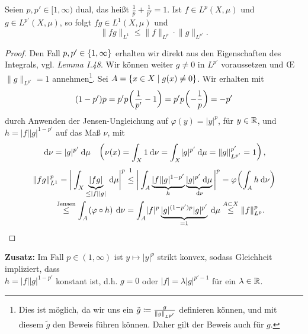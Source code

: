 \documentclass[skript.tex]{subfiles}
\begin{document}
	
\setcounter{cntr}{5}

\begin{theorem}[Hölder]
	Seien $p, p' \in [1, \infty)$ \textup{dual}, das heißt $\frac{1}{p} + \frac{1}{p'} = 1$. Ist $f \in L^p (X, \mu)$ und \\ $g \in L^{p'} (X,\mu)$, so folgt $fg \in L^1(X,\mu)$ und 
	\[
		\lVert fg \rVert_{L^1} \leq \lVert f \rVert_{L^p} \cdot \lVert g \rVert_{L^{p'}}.
	\]
\end{theorem}

\begin{proof}
	Den Fall $p,p' \in \left\{1,\infty\right\}$ erhalten wir direkt aus den Eigenschaften des Integrals, vgl. \textit{Lemma I.48}. Wir können weiter $g\neq 0$ in $L^{p'}$ voraussetzen und \OE\ $\lVert g \rVert_{L^{p'}} = 1$ annehmen\footnote{Dies ist möglich, da wir uns ein $\tilde{g} \coloneqq \frac{g}{\lVert g \rVert_{L^{p'} } }$ definieren können, und mit diesem $\tilde{g}$ den Beweis führen können. Daher gilt der Beweis auch für $g$.}. Sei $A = \left\{x\in X \mid g(x) \neq 0\right\}$. Wir erhalten mit 
	\[
		(1-p')p = p'p\pr{\frac{1}{p'} -1} = p'p\pr{-\frac{1}{p}} = -p'
	\]
	durch Anwenden der Jensen-Ungleichung auf $\varphi(y) = \lvert y \rvert^p$, für $y \in \mathbb{R}$, und $h=\lvert f \rvert \lvert g \rvert^{1-p'}$ auf das Maß $\nu$, mit 
	\[
		\md \nu = \lvert g \rvert^{p'} \md \mu \quad \pr{\nu(x) = \int_X 1 \md \nu = \int_X \lvert g \rvert^{p'} \md \mu = \lVert g \rVert_{L^{p'}}^{p'} = 1},
	\]
	\begin{align*}
		\lVert fg \rVert_{L^1}^{p} &= \bigg\lvert \int_X \underbrace{\lvert fg \rvert }_{\leq \lvert f \rvert \lvert g \rvert} \md \mu \bigg\rvert^p \stackrel{\footnotemark}{\leq} \bigg\lvert \int_A \underbrace{\lvert f \rvert \lvert g \rvert^{1-p'}}_{h} \underbrace{\lvert g \rvert^{p'} \md \mu}_{\md \nu} \bigg\rvert^p = \varphi \pr{\int_A h \md \nu}\\
		&\kern -0.5em \stackrel{\text{\scriptsize Jensen}}{\leq} \int_A \pr{\varphi \circ h} \md \nu = \int_A \lvert f \rvert^p \underbrace{\lvert g \rvert^{(1-p')p} \lvert g \rvert^{p'}}_{=1} \md \mu \stackrel{A\sbs X}{\leq} \lVert f \rVert_{L^p}^p.
	\end{align*}
\end{proof}

\textbf{Zusatz:} Im Fall $p \in (1, \infty)$ ist $y \mapsto \lvert y \rvert^p$ strikt konvex, sodass Gleichheit impliziert, dass \\$h = \lvert f \rvert \lvert g \rvert^{1-p'}$ konstant ist, d.h. $g=0$ oder $\lvert f \rvert = \lambda \lvert g \rvert^{p'-1}$ für ein $\lambda \in \mathbb{R}$. %
\end{document}

